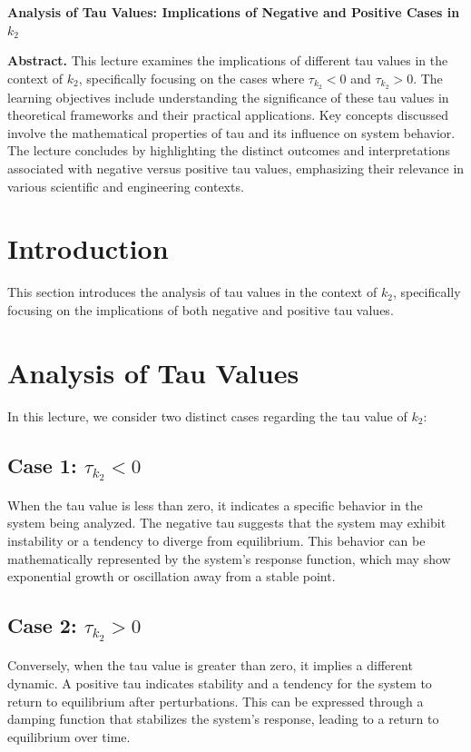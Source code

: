 \documentclass[a4paper]{article}
\begin{document}
\begin{center}
{\LARGE \textbf{Analysis of Tau Values: Implications of Negative and Positive Cases in \( k_2 \)}}\\[1em]
\end{center}

\textbf{Abstract.} This lecture examines the implications of different tau values in the context of \( k_2 \), specifically focusing on the cases where \( \tau_{k_2} < 0 \) and \( \tau_{k_2} > 0 \). The learning objectives include understanding the significance of these tau values in theoretical frameworks and their practical applications. Key concepts discussed involve the mathematical properties of tau and its influence on system behavior. The lecture concludes by highlighting the distinct outcomes and interpretations associated with negative versus positive tau values, emphasizing their relevance in various scientific and engineering contexts.

\section{Introduction}
This section introduces the analysis of tau values in the context of \( k_2 \), specifically focusing on the implications of both negative and positive tau values.

\section{Analysis of Tau Values}
In this lecture, we consider two distinct cases regarding the tau value of \( k_2 \):

\subsection{Case 1: \( \tau_{k_2} < 0 \)}
When the tau value is less than zero, it indicates a specific behavior in the system being analyzed. The negative tau suggests that the system may exhibit instability or a tendency to diverge from equilibrium. This behavior can be mathematically represented by the system's response function, which may show exponential growth or oscillation away from a stable point.

\subsection{Case 2: \( \tau_{k_2} > 0 \)}
Conversely, when the tau value is greater than zero, it implies a different dynamic. A positive tau indicates stability and a tendency for the system to return to equilibrium after perturbations. This can be expressed through a damping function that stabilizes the system's response, leading to a return to equilibrium over time.
\end{document}
